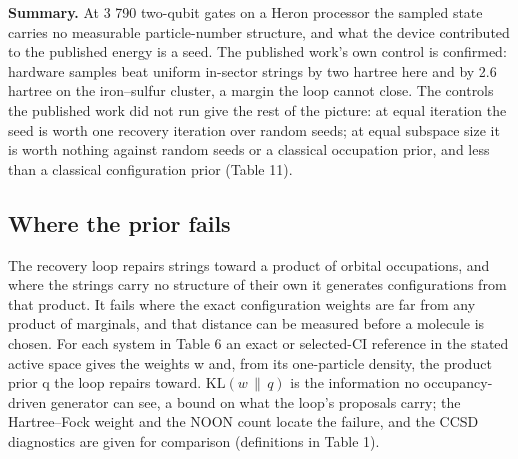 \documentclass[11pt]{article}
\begin{document}
\textbf{Summary.} At 3 790 two-qubit gates on a Heron processor the sampled state carries no measurable particle-number structure, and what the device contributed to the published energy is a seed. The published work's own control is confirmed: hardware samples beat uniform in-sector strings by two hartree here and by 2.6 hartree on the iron--sulfur cluster, a margin the loop cannot close. The controls the published work did not run give the rest of the picture: at equal iteration the seed is worth one recovery iteration over random seeds; at equal subspace size it is worth nothing against random seeds or a classical occupation prior, and less than a classical configuration prior (Table 11).

\subsection{Where the prior fails}\label{sec:3.5}


The recovery loop repairs strings toward a product of orbital occupations, and where the strings carry no structure of their own it generates configurations from that product. It fails where the exact configuration weights are far from any product of marginals, and that distance can be measured before a molecule is chosen. For each system in Table 6 an exact or selected-CI reference in the stated active space gives the weights w and, from its one-particle density, the product prior q the loop repairs toward. $\mathrm{KL}(w\,\|\,q)$ is the information no occupancy-driven generator can see, a bound on what the loop's proposals carry; the Hartree--Fock weight and the NOON count locate the failure, and the CCSD diagnostics are given for comparison (definitions in Table 1).
\end{document}
